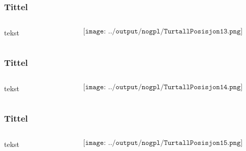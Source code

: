 \documentclass[aspectratio=169,xcolor=dvipsnames]{beamer}
\begin{document}
\begin{frame}
	\frametitle{Tittel}
	\begin{columns}
		\begin{column}{0.5\textwidth}
tekst
			
		\end{column}

		\begin{column}{0.5\textwidth}
	$$\texttt{[image: ../output/nogpl/TurtallPosisjon13.png]}$$
		\end{column}
	\end{columns}
\end{frame}

\begin{frame}
	\frametitle{Tittel}
	\begin{columns}
		\begin{column}{0.5\textwidth}
tekst
			
		\end{column}

		\begin{column}{0.5\textwidth}
	$$\texttt{[image: ../output/nogpl/TurtallPosisjon14.png]}$$
		\end{column}
	\end{columns}
\end{frame}

\begin{frame}
	\frametitle{Tittel}
	\begin{columns}
		\begin{column}{0.5\textwidth}
tekst
			
		\end{column}

		\begin{column}{0.5\textwidth}
	$$\texttt{[image: ../output/nogpl/TurtallPosisjon15.png]}$$
		\end{column}
	\end{columns}
\end{frame}
\end{document}
